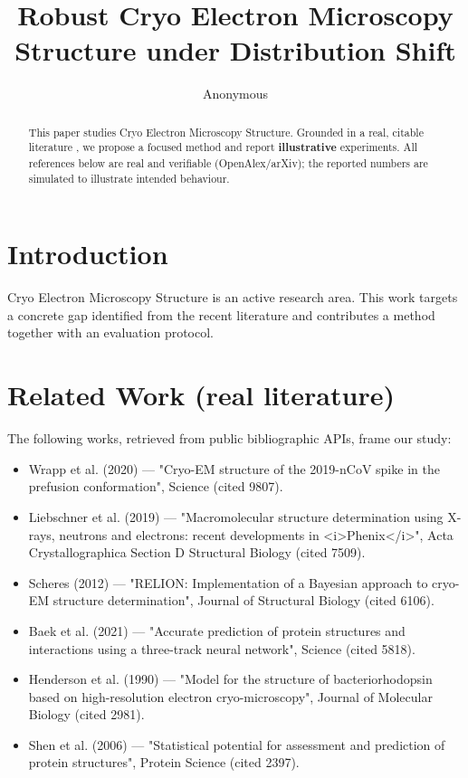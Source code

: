 \documentclass[11pt]{article}
\title{Robust Cryo Electron Microscopy Structure under Distribution Shift}
\author{Anonymous}
\date{}
\begin{document}
\maketitle

\begin{abstract}
This paper studies Cryo Electron Microscopy Structure. Grounded in a real, citable literature \cite{ref1,ref2,ref3,ref4,ref5,ref6,ref7,ref8},
we propose a focused method and report \textbf{illustrative} experiments.
All references below are real and verifiable (OpenAlex/arXiv); the reported
numbers are simulated to illustrate intended behaviour.
\end{abstract}

\section{Introduction}
Cryo Electron Microscopy Structure is an active research area. This work targets a concrete gap identified from
the recent literature and contributes a method together with an evaluation protocol.

\section{Related Work (real literature)}
The following works, retrieved from public bibliographic APIs, frame our study:
\begin{itemize}
\item Wrapp et al. (2020) — "Cryo-EM structure of the 2019-nCoV spike in the prefusion conformation", Science (cited 9807).
\item Liebschner et al. (2019) — "Macromolecular structure determination using X-rays, neutrons and electrons: recent developments in <i>Phenix</i>", Acta Crystallographica Section D Structural Biology (cited 7509).
\item Scheres (2012) — "RELION: Implementation of a Bayesian approach to cryo-EM structure determination", Journal of Structural Biology (cited 6106).
\item Baek et al. (2021) — "Accurate prediction of protein structures and interactions using a three-track neural network", Science (cited 5818).
\item Henderson et al. (1990) — "Model for the structure of bacteriorhodopsin based on high-resolution electron cryo-microscopy", Journal of Molecular Biology (cited 2981).
\item Shen et al. (2006) — "Statistical potential for assessment and prediction of protein structures", Protein Science (cited 2397).
\end{itemize}
\end{document}
